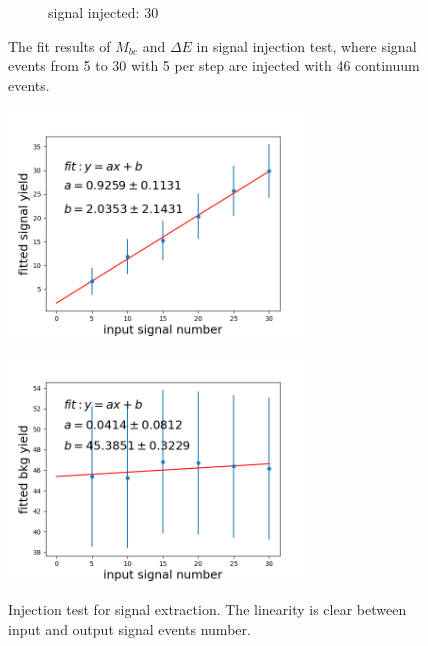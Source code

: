 \begin{figure}[htpb]
\begin{subfigure}{0.5\linewidth}
		\caption{signal injected: 30}
	\end{subfigure}
\caption{The fit results of $M_{bc}$ and $\Delta E$ in signal injection test, where signal events from 5 to 30 with 5 per step are injected with 46 continuum events.}
\label{fig:2Dinject}
\end{figure}


\begin{figure}[htpb]
	\begin{minipage}[b]{0.5\linewidth}
		\centering 
		\includegraphics[height=6cm]{figures/inject_line_sig}
		\label{}
	\end{minipage}
	\begin{minipage}[b]{0.5\linewidth}
		\centering 
		\includegraphics[height=6cm]{figures/inject_line_bkg}
		\label{}
	\end{minipage}
	\caption{Injection test for signal extraction. The linearity is clear between input and output signal events number.}
	\label{fig:2Dinjectline}
\end{figure}

